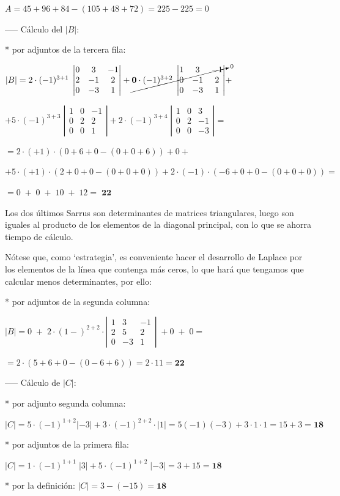 \begin{ejem}
 $A= 45+96+84-(105+48+72)=225-225=0$
 
 ----- Cálculo del $|B|$:
 
 * por adjuntos de la tercera fila:

$|B|= 2\cdot (-1)^{3+1}\; \left| \begin{matrix} 0&3&-1\\2&-1&2\\0&-3&1  \end{matrix} \right| +
\cancelto{0}{\boldsymbol{0} \cdot (-1)^{3+2} \; \left| \begin{matrix}  1&3&-1\\0&-1&2\\0&-3&1 \end{matrix} \right|} +$

$+5 \cdot (-1)^{3+3}\; \left| \begin{matrix}  1&0&-1\\0&2&2\\0&0&1 \end{matrix} \right|+ 
2 \cdot (-1)^{3+4} \; \left| \begin{matrix} 1&0&3\\0&2&-1\\0&0&-3   \end{matrix} \right|= $

$=2\cdot(+1) \cdot (0+6+0-(0+0+6)) +0+$

$+5\cdot(+1)\cdot (2+0+0-(0+0+0)) + 2\cdot (-1) \cdot (-6+0+0-(0+0+0))=$

$=0 \; + \; 0 \; + \; 10 \; + \; 12 = \; \boldsymbol{22} $

\scriptsize{Los dos últimos Sarrus son determinantes de matrices triangulares, luego son iguales al producto de los elementos de la diagonal principal, con lo que se ahorra tiempo de cálculo}\normalsize{.}

Nótese que, como `estrategia', es conveniente hacer el desarrollo de Laplace por los elementos de la línea que contenga más ceros, lo que hará que tengamos que calcular menos determinantes, por ello:

* por adjuntos de la segunda columna:

$|B|=  0\; + \; 2 \cdot (1-)^{2+2} \cdot \left| \begin{matrix} 1&3&-1\\2&5&2\\0&-3&1  \end{matrix} \right|\; + 0 \; + \; 0=$

$=2\cdot (5+6+0-(0-6+6))= 2 \cdot 11 = \boldsymbol {22}$


----- Cálculo de $|C|$:

* por adjunto segunda columna:

$|C|= 5 \cdot (-1)^{1+2} |-3|+ 3\cdot (-1)^{2+2}\cdot |1|= 5(-1)(-3)+3\cdot 1\cdot 1=15+3=\boldsymbol{18}$

* por adjuntos de la primera fila:

$|C|= 1\cdot (-1)^{1+1}\;|3|+5\cdot (-1)^{1+2}\; |-3| = 3+15=\boldsymbol{18}$

* por la definición:  $|C|=3-(-15)=\boldsymbol{18}$
 
\end{ejem}

